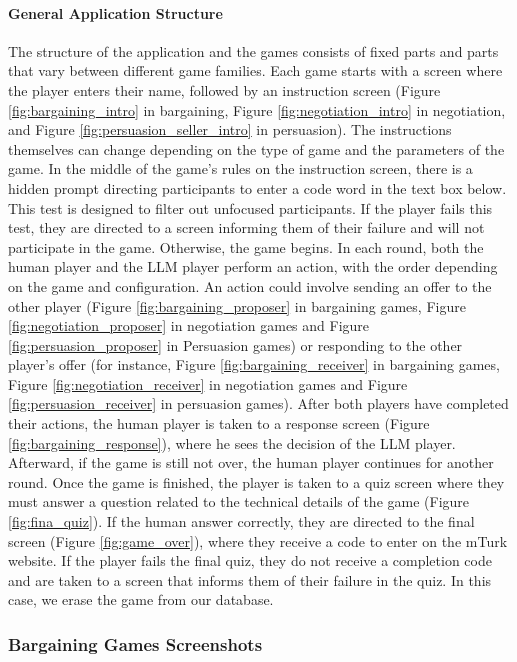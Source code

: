 \paragraph{General Application Structure}
The structure of the application and the games consists of fixed parts and parts that vary between different game families. Each game starts with a screen where the player enters their name, followed by an instruction screen (Figure \ref{fig:bargaining_intro} in bargaining, Figure \ref{fig:negotiation_intro} in negotiation, and Figure \ref{fig:persuasion_seller_intro} in persuasion). The instructions themselves can change depending on the type of game and the parameters of the game.
In the middle of the game’s rules on the instruction screen, there is a hidden prompt directing participants to enter a code word in the text box below. This test is designed to filter out unfocused participants.
If the player fails this test, they are directed to a screen informing them of their failure and will not participate in the game. Otherwise, the game begins. In each round, both the human player and the LLM player perform an action, with the order depending on the game and configuration. An action could involve sending an offer to the other player
(Figure \ref{fig:bargaining_proposer} in bargaining games, Figure \ref{fig:negotiation_proposer} in negotiation games and
Figure \ref{fig:persuasion_proposer} in Persuasion games)
or responding to the other player's offer (for instance, Figure \ref{fig:bargaining_receiver} in bargaining games, Figure \ref{fig:negotiation_receiver} in negotiation games and
Figure \ref{fig:persuasion_receiver} in persuasion games). After both players have completed their actions, the human player is taken to a response screen (Figure \ref{fig:bargaining_response}), where he sees the decision of the LLM player. Afterward, if the game is still not over, the human player continues for another round. Once the game is finished, the player is taken to a quiz screen where they must answer a question related to the technical details of the game (Figure \ref{fig:fina_quiz}). If the human answer correctly, they are directed to the final screen (Figure \ref{fig:game_over}), where they receive a code to enter on the mTurk website. If the player fails the final quiz, they do not receive a completion code and are taken to a screen that informs them of their failure in the quiz. In this case, we erase the game from our database.

\subsubsection{Bargaining Games Screenshots}

